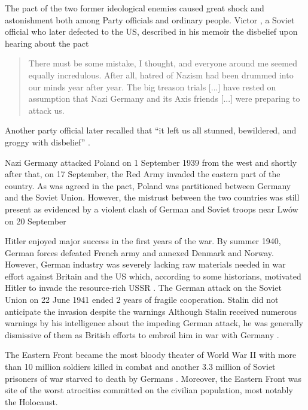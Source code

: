The pact of the two former ideological enemies caused great shock and astonishment both among Party officials and ordinary people. 
Victor  \citet[p. 332]{kravchenko_i_1947}, a Soviet official who later defected to the US,   described in  his memoir the disbelief upon hearing about the pact  
\begin{quote}
There must be some mistake, I thought, and everyone around me seemed equally incredulous. After all, hatred of Nazism had been drummed into our minds year after year.  The big treason trials [...] have rested on assumption that Nazi Germany and its Axis friends [...]  were preparing to attack us. 
\end{quote}
Another party official later recalled that \enquote{it left us all stunned, bewildered, and groggy with disbelief} \citep[p. 137]{robinson_black_1988}. 

Nazi Germany attacked Poland on 1 September 1939 from the west and shortly after that, on 17 September, the Red Army invaded the eastern part of the country.  As was agreed in the pact, Poland was partitioned between Germany and the Soviet Union.
However, the mistrust between the two countries was still present as evidenced by a violent clash of German and Soviet troops near Lwów on 20 September \citep[p. 685]{kotkin_stalin:_2017}

Hitler enjoyed major success in the first years of the war.
By summer 1940, German forces defeated French army and annexed Denmark and Norway. However, German industry was severely lacking raw materials needed in war effort against Britain and the US which, according to some historians, motivated Hitler to invade the resource-rich USSR \citep{tooze_wages_2008}. The German attack on the Soviet Union on 22 June 1941 ended 2 years of fragile cooperation.
Stalin did not anticipate the invasion despite the warnings 
Although Stalin received numerous warnings by his intelligence about the impeding German attack, he was generally dismissive of them as British efforts to embroil him in war with Germany  \citep[chapter 14]{kotkin_stalin:_2017}. 

The Eastern Front became the most bloody theater of World War II with more than 10 million soldiers killed in combat and another 3.3 million of Soviet prisoners of war starved to death  by Germans \citep[p. 155]{snyder_bloodlands:_2011}. Moreover, the Eastern Front was site of the worst atrocities committed on the civilian population, most notably the Holocaust. 

